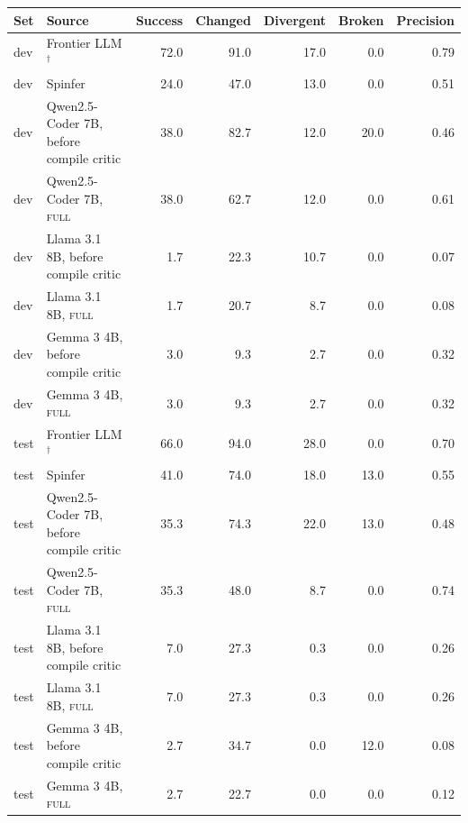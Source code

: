 \begin{tabular}{llrrrrr}
\toprule
Set & Source & Success & Changed & Divergent & Broken & Precision \\
\midrule
dev & Frontier LLM$^\dagger$ & 72.0 & 91.0 & 17.0 & 0.0 & 0.79 \\
dev & Spinfer & 24.0 & 47.0 & 13.0 & 0.0 & 0.51 \\
dev & Qwen2.5-Coder 7B, before compile critic & 38.0 & 82.7 & 12.0 & 20.0 & 0.46 \\
dev & Qwen2.5-Coder 7B, \textsc{full} & 38.0 & 62.7 & 12.0 & 0.0 & 0.61 \\
dev & Llama 3.1 8B, before compile critic & 1.7 & 22.3 & 10.7 & 0.0 & 0.07 \\
dev & Llama 3.1 8B, \textsc{full} & 1.7 & 20.7 & 8.7 & 0.0 & 0.08 \\
dev & Gemma 3 4B, before compile critic & 3.0 & 9.3 & 2.7 & 0.0 & 0.32 \\
dev & Gemma 3 4B, \textsc{full} & 3.0 & 9.3 & 2.7 & 0.0 & 0.32 \\
\midrule
test & Frontier LLM$^\dagger$ & 66.0 & 94.0 & 28.0 & 0.0 & 0.70 \\
test & Spinfer & 41.0 & 74.0 & 18.0 & 13.0 & 0.55 \\
test & Qwen2.5-Coder 7B, before compile critic & 35.3 & 74.3 & 22.0 & 13.0 & 0.48 \\
test & Qwen2.5-Coder 7B, \textsc{full} & 35.3 & 48.0 & 8.7 & 0.0 & 0.74 \\
test & Llama 3.1 8B, before compile critic & 7.0 & 27.3 & 0.3 & 0.0 & 0.26 \\
test & Llama 3.1 8B, \textsc{full} & 7.0 & 27.3 & 0.3 & 0.0 & 0.26 \\
test & Gemma 3 4B, before compile critic & 2.7 & 34.7 & 0.0 & 12.0 & 0.08 \\
test & Gemma 3 4B, \textsc{full} & 2.7 & 22.7 & 0.0 & 0.0 & 0.12 \\
\bottomrule
\end{tabular}
